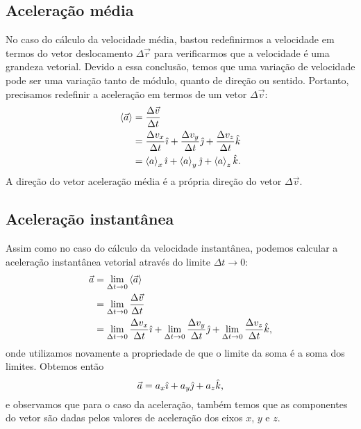\subsection{Aceleração média}

No caso do cálculo da velocidade média, bastou redefinirmos a velocidade em termos do vetor deslocamento $\Delta\vec{r}$ para verificarmos que a velocidade é uma grandeza vetorial. Devido a essa conclusão, temos que uma variação de velocidade pode ser uma variação tanto de módulo, quanto de direção ou sentido. Portanto, precisamos redefinir a aceleração em termos de um vetor $\Delta\vec{v}$:
\begin{align}
  \left\langle{\vec{a}}\right\rangle &= \frac{\Delta\vec{v}}{\Delta t} \\
  &= \frac{\Delta v_x}{\Delta t}\hat{\imath} + \frac{\Delta v_y}{\Delta t}\hat{\jmath} + \frac{\Delta v_z}{\Delta t}\hat{k} \\
  &= \left\langle{a}\right\rangle_x\hat{\imath} + \left\langle{a}\right\rangle_y\hat{\jmath} + \left\langle{a}\right\rangle_z\hat{k}.
\end{align} 
%
A direção do vetor aceleração média é a própria direção do vetor $\Delta{\vec{v}}$. 

\subsection{Aceleração instantânea}

Assim como no caso do cálculo da velocidade instantânea, podemos calcular a aceleração instantânea vetorial através do limite $\Delta t \to 0$:
\begin{align}
  \vec{a} &= \lim_{\Delta t \to 0} \left\langle{\vec{a}}\right\rangle \\
  &= \lim_{\Delta t \to 0} \frac{\Delta \vec{v}}{\Delta t} \\
  &= \lim_{\Delta t \to 0} \frac{\Delta {v_x}}{\Delta t}\hat{\imath} + \lim_{\Delta t \to 0} \frac{\Delta {v_y}}{\Delta t}\hat{\jmath} + \lim_{\Delta t \to 0} \frac{\Delta {v_z}}{\Delta t}\hat{k},
\end{align}
%
onde utilizamos novamente a propriedade de que o limite da soma é a soma dos limites. Obtemos então
\begin{equation}
  \vec{a} = a_x \hat{\imath} + a_y \hat{\jmath} + a_z \hat{k},
\end{equation}
%
e observamos que para o caso da aceleração, também temos que as componentes do vetor são dadas pelos valores de aceleração dos eixos $x$, $y$ e $z$.

